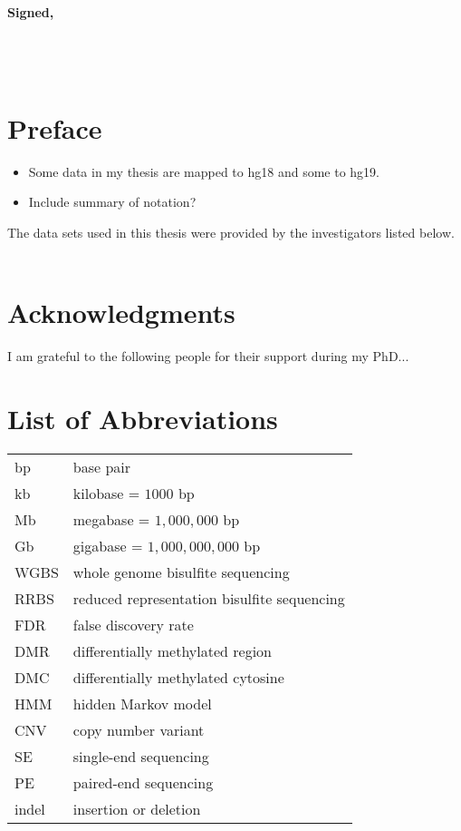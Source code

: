 \documentclass[11pt,a4paper,oneside]{book}	%
\begin{document}
\vspace{2cm}


{\large\bf Signed,\\\\\\\\}



\chapter{Preface}

\begin{itemize}
  \item Some data in my thesis are mapped to hg18 and some to hg19.
  \item Include summary of notation?
\end{itemize}

The data sets used in this thesis were provided by the investigators listed below.\\\\

\chapter{Acknowledgments}

I am grateful to the following people for their support during my PhD...


\tableofcontents

\listoffigures

\listoftables


\chapter{List of Abbreviations}

\begin{tabular}{ll}

bp & base pair \\
kb & kilobase = $1000$ bp \\
Mb & megabase = $1,000,000$ bp \\
Gb & gigabase = $1,000,000,000$ bp \\
WGBS & whole genome bisulfite sequencing \\
RRBS & reduced representation bisulfite sequencing \\
FDR & false discovery rate \\
DMR & differentially methylated region \\
DMC & differentially methylated cytosine \\
HMM & hidden Markov model \\
CNV & copy number variant \\
SE & single-end sequencing \\
PE & paired-end sequencing \\
indel & insertion or deletion \\

\end{tabular}
\end{document}
